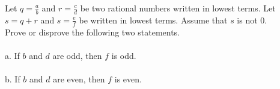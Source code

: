 \documentclass{amsart}
\theoremstyle{definition}
\theoremstyle{Exercise}
\theoremstyle{remark}
\theoremstyle{rule}
\numberwithin{equation}{section}
\begin{document}
Let $\displaystyle q = \frac{a}{b}$ and $\displaystyle r = \frac{c}{d}$ be two rational numbers written in lowest terms. Let $s = q + r$ and $\displaystyle s = \frac{e}{f}$ be written in lowest terms. Assume that $s$ is not $0$.\\

 Prove or disprove the following two statements.
\\\\
a.  If $b$ and $d$ are odd, then $f$ is odd.
\\\\
b. If $b$ and $d$ are even, then $f$ is even.
\\\\
\\\\


\newpage
\end{document}
